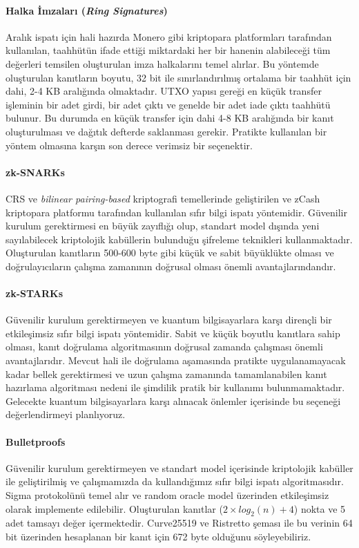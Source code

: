 \documentclass[a4paper,11pt]{article}
\begin{document}
\paragraph{Halka İmzaları (\emph{Ring Signatures})}

Aralık ispatı için hali hazırda Monero gibi kriptopara platformları tarafından kullanılan, taahhütün ifade ettiği miktardaki her bir hanenin alabileceği tüm değerleri temsilen oluşturulan imza halkalarını temel alırlar. Bu yöntemde oluşturulan kanıtların boyutu, 32 bit ile sınırlandırılmış ortalama bir taahhüt için dahi, 2-4 KB aralığında olmaktadır. UTXO yapısı gereği en küçük transfer işleminin bir adet girdi, bir adet çıktı ve genelde bir adet iade çıktı taahhütü bulunur. Bu durumda en küçük transfer için dahi 4-8 KB aralığında bir kanıt oluşturulması ve dağıtık defterde saklanması gerekir. Pratikte kullanılan bir yöntem olmasına karşın son derece verimsiz bir seçenektir.


\paragraph{zk-SNARKs}

CRS ve \emph{bilinear pairing-based} kriptografi temellerinde geliştirilen ve zCash kriptopara platformu tarafından kullanılan sıfır bilgi ispatı yöntemidir. Güvenilir kurulum gerektirmesi en büyük zayıflığı olup, standart model dışında yeni sayılabilecek kriptolojik kabüllerin bulunduğu şifreleme teknikleri kullanmaktadır. Oluşturulan kanıtların 500-600 byte gibi küçük ve sabit büyüklükte olması ve doğrulayıcıların çalışma zamanının doğrusal olması önemli avantajlarındandır.


\paragraph{zk-STARKs\cite{zkstarks}}

Güvenilir kurulum gerektirmeyen ve kuantum bilgisayarlara karşı dirençli bir etkileşimsiz sıfır bilgi ispatı yöntemidir. Sabit ve küçük boyutlu kanıtlara sahip olması, kanıt doğrulama algoritmasının doğrusal zamanda çalışması önemli avantajlarıdır. Mevcut hali ile doğrulama aşamasında pratikte uygulanamayacak kadar bellek gerektirmesi ve uzun çalışma zamanında tamamlanabilen kanıt hazırlama algoritması nedeni ile şimdilik pratik bir kullanımı bulunmamaktadır. Gelecekte kuantum bilgisayarlara karşı alınacak önlemler içerisinde bu seçeneği değerlendirmeyi planlıyoruz.


\paragraph{Bulletproofs\cite{bulletproofs}}
Güvenilir kurulum gerektirmeyen ve standart model içerisinde kriptolojik kabüller ile geliştirilmiş ve çalışmamızda da kullandığımız sıfır bilgi ispatı algoritmasıdır. Sigma protokolünü temel alır ve random oracle model üzerinden etkileşimsiz olarak implemente edilebilir. Oluşturulan kanıtlar ($2 \times log_{2}(n) + 4$) nokta ve 5 adet tamsayı değer içermektedir. Curve25519 ve Ristretto şeması ile bu verinin 64 bit üzerinden hesaplanan bir kanıt için 672 byte olduğunu söyleyebiliriz.
\end{document}
